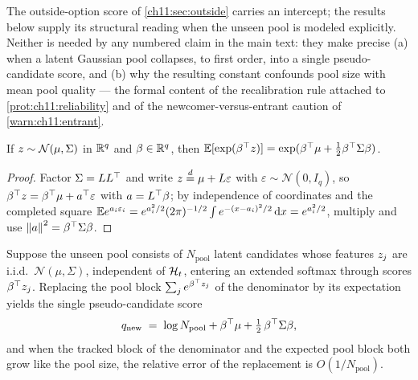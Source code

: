 The outside-option score of \cref{ch11:sec:outside} carries an intercept; the results below supply
its structural reading when the unseen pool is modeled explicitly. Neither is needed by any numbered
claim in the main text: they make precise (a) when a latent Gaussian pool collapses, to first order,
into a single pseudo-candidate score, and (b) why the resulting constant confounds pool size with
mean pool quality --- the formal content of the recalibration rule attached to
\cref{prot:ch11:reliability} and of the newcomer-versus-entrant caution of \cref{warn:ch11:entrant}.
\begin{lemma}
\label{app:pf:mgf}
If $z \sim \mathcal{N}(\mu, \Sigma)$ in $\mathbb{R}^q$ and $\beta \in \mathbb{R}^q$, then $\mathbb{E}[\exp(\beta^{\top}
z)] = \exp(\beta^{\top} \mu + \tfrac12 \beta^{\top} \Sigma \beta)$.
\end{lemma}
\begin{proof}
Factor $\Sigma = L L^{\top}$ and write $z \stackrel{d}{=} \mu + L\varepsilon$ with $\varepsilon \sim
\mathcal{N}(0, I_q)$, so $\beta^{\top} z = \beta^{\top} \mu + a^{\top} \varepsilon$ with $a = L^{\top} \beta$; by
independence of coordinates and the completed square $\mathbb{E} e^{a_i \varepsilon_i} = e^{a_i^2/2}
(2\pi)^{-1/2}\int e^{-(x - a_i)^2/2}\,\mathrm{d} x = e^{a_i^2/2}$, multiply and use $\left\lVert a\right\rVert^2 = \beta^{\top}
\Sigma \beta$.
\end{proof}
\begin{proposition}
\label{app:pf:entrant}
Suppose the unseen pool consists of $N_{\mathrm{pool}}$ latent candidates whose features $z_j$
are i.i.d.\ $\mathcal{N}(\mu, \Sigma)$, independent of $\mathcal{H}_t$, entering an extended softmax through
scores $\beta^{\top} z_j$. Replacing the pool block $\sum_{j} e^{\beta^{\top} z_j}$ of the
denominator by its expectation yields the single pseudo-candidate score
\begin{equation}
\label{eq:app:pf:entrant}
q_{\mathrm{new}} \;=\; \log N_{\mathrm{pool}} + \beta^{\top} \mu + \tfrac12\, \beta^{\top} \Sigma \beta ,
\end{equation}
and when the tracked block of the denominator and the expected pool block both grow like the pool
size, the relative error of the replacement is $O(1/N_{\mathrm{pool}})$.
\end{proposition}
